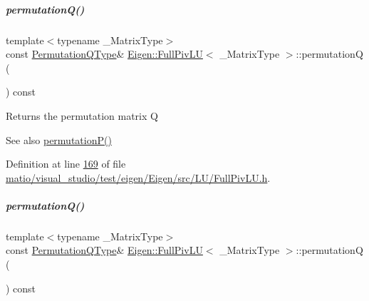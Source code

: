 \mbox{\label{group___l_u___module_a8d18190c7618de271cba7293f0493a36}} 
\subparagraph{\texorpdfstring{permutation\+Q()}{permutationQ()}\hspace{0.1cm}{\footnotesize\ttfamily [1/2]}}
{\footnotesize\ttfamily template$<$typename \+\_\+\+Matrix\+Type$>$ \\
const \hyperlink{group___core___module}{Permutation\+Q\+Type}\& \hyperlink{group___l_u___module_class_eigen_1_1_full_piv_l_u}{Eigen\+::\+Full\+Piv\+LU}$<$ \+\_\+\+Matrix\+Type $>$\+::permutationQ (\begin{DoxyParamCaption}{ }\end{DoxyParamCaption}) const\hspace{0.3cm}{\ttfamily [inline]}}

\begin{DoxyReturn}{Returns}
the permutation matrix Q
\end{DoxyReturn}
\begin{DoxySeeAlso}{See also}
\hyperlink{group___l_u___module_a09274c82240f6441af5e6c99e24e756d}{permutation\+P()} 
\end{DoxySeeAlso}


Definition at line \hyperlink{matio_2visual__studio_2test_2eigen_2_eigen_2src_2_l_u_2_full_piv_l_u_8h_source_l00169}{169} of file \hyperlink{matio_2visual__studio_2test_2eigen_2_eigen_2src_2_l_u_2_full_piv_l_u_8h_source}{matio/visual\+\_\+studio/test/eigen/\+Eigen/src/\+L\+U/\+Full\+Piv\+L\+U.\+h}.

\mbox{\label{group___l_u___module_a8d18190c7618de271cba7293f0493a36}} 
\subparagraph{\texorpdfstring{permutation\+Q()}{permutationQ()}\hspace{0.1cm}{\footnotesize\ttfamily [2/2]}}
{\footnotesize\ttfamily template$<$typename \+\_\+\+Matrix\+Type$>$ \\
const \hyperlink{group___core___module}{Permutation\+Q\+Type}\& \hyperlink{group___l_u___module_class_eigen_1_1_full_piv_l_u}{Eigen\+::\+Full\+Piv\+LU}$<$ \+\_\+\+Matrix\+Type $>$\+::permutationQ (\begin{DoxyParamCaption}{ }\end{DoxyParamCaption}) const\hspace{0.3cm}{\ttfamily [inline]}}

